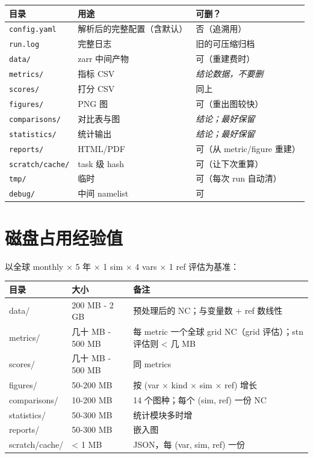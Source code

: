 \begin{longtable}{p{2.5cm} p{4cm} p{6cm}}
  \toprule
  目录 & 用途 & 可删？ \\
  \midrule
  \endhead
  \texttt{config.yaml} & 解析后的完整配置（含默认） & 否（追溯用） \\
  \texttt{run.log} & 完整日志 & 旧的可压缩归档 \\
  \texttt{data/} & zarr 中间产物 & 可（重建费时） \\
  \texttt{metrics/} & 指标 CSV & \emph{结论数据，不要删} \\
  \texttt{scores/} & 打分 CSV & 同上 \\
  \texttt{figures/} & PNG 图 & 可（重出图较快） \\
  \texttt{comparisons/} & 对比表与图 & \emph{结论；最好保留} \\
  \texttt{statistics/} & 统计输出 & \emph{结论；最好保留} \\
  \texttt{reports/} & HTML/PDF & 可（从 metric/figure 重建） \\
  \texttt{scratch/cache/} & task 级 hash & 可（让下次重算） \\
  \texttt{tmp/} & 临时 & 可（每次 run 自动清） \\
  \texttt{debug/} & 中间 namelist & 可 \\
  \bottomrule
\end{longtable}

\section{磁盘占用经验值}

以全球 monthly × 5 年 × 1 sim × 4 vars × 1 ref 评估为基准：

\begin{longtable}{p{3cm} p{3cm} p{6cm}}
  \toprule
  目录 & 大小 & 备注 \\
  \midrule
  \endhead
  data/ & 200 MB - 2 GB & 预处理后的 NC；与变量数 + ref 数线性 \\
  metrics/ & 几十 MB - 500 MB & 每 metric 一个全球 grid NC（grid 评估）；stn 评估则 < 几 MB \\
  scores/ & 几十 MB - 500 MB & 同 metrics \\
  figures/ & 50-200 MB & 按 (var × kind × sim × ref) 增长 \\
  comparisons/ & 10-200 MB & 14 个图种；每个 (sim, ref) 一份 NC \\
  statistics/ & 50-300 MB & 统计模块多时增 \\
  reports/ & 50-300 MB & 嵌入图 \\
  scratch/cache/ & < 1 MB & JSON，每 (var, sim, ref) 一份 \\
  \bottomrule
\end{longtable}

